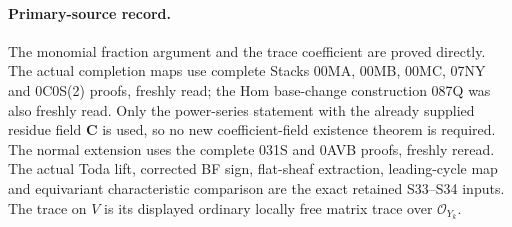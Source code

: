 \paragraph{Primary-source record.}
The monomial fraction argument and the
trace coefficient are proved directly.
The actual completion maps use complete
Stacks 00MA, 00MB, 00MC, 07NY and 0C0S(2)
proofs, freshly read; the Hom base-change
construction 087Q was also freshly read.
Only the power-series statement with the
already supplied residue field $\mathbf C$
is used, so no new coefficient-field
existence theorem is required.
The normal extension uses the complete
031S and 0AVB proofs, freshly reread.
The actual Toda lift, corrected BF sign,
flat-sheaf extraction, leading-cycle
map and equivariant characteristic
comparison are the exact retained
S33--S34 inputs. The trace on $V$
is its displayed ordinary locally free
matrix trace over $\mathcal O_{Y_k}$.
